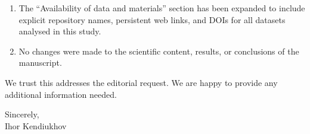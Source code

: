 \documentclass[11pt]{article}
\begin{document}
\begin{enumerate}[leftmargin=1.5em]
\item The ``Availability of data and materials'' section has been expanded to include explicit repository names, persistent web links, and DOIs for all datasets analysed in this study.
\item No changes were made to the scientific content, results, or conclusions of the manuscript.
\end{enumerate}

We trust this addresses the editorial request. We are happy to provide any additional information needed.

\vspace{1em}
Sincerely,\\
Ihor Kendiukhov
\end{document}
